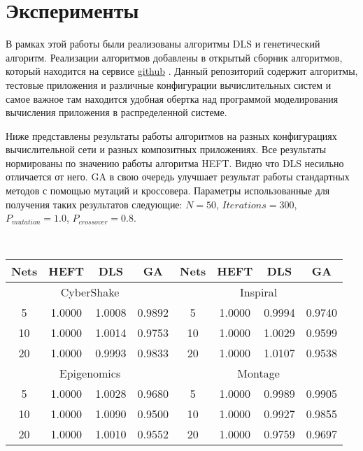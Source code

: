 \chapter*{Эксперименты}
\begin{spacing}{1.3}

В рамках этой работы были реализованы алгоритмы DLS и генетический алгоритм.  Реализации алгоритмов добавлены в открытый сборник алгоритмов, который находится на сервисе \href{https://github.com/alexmnazarenko/pysimgrid}{github} \cite{GIT}. Данный репозиторий содержит алгоритмы, тестовые приложения и различные конфигурации вычислительных систем и самое важное там находится удобная обертка над программой моделирования вычисления приложения в распределенной системе.

Ниже представлены результаты работы алгоритмов на разных конфигурациях вычислительной сети и разных композитных приложениях. Все результаты нормированы по значению работы алгоритма HEFT. Видно что DLS несильно отличается от него. GA в свою очередь улучшает результат работы стандартных методов с помощью мутаций и кроссовера. Параметры использованные для получения таких результатов следующие: $N = 50$, $Iterations = 300$, $P_{mutation} = 1.0$, $P_{crossover} = 0.8$.

~

\begin{center}
\begin{tabular}{|c|c|c|c || c|c|c|c|}
\hline
Nets & HEFT &  DLS &  GA & Nets & HEFT &  DLS &  GA \\ 
\hline
\multicolumn{4}{|c||}{CyberShake} & \multicolumn{4}{c|}{ Inspiral} \\ 
\hline
5     &     1.0000 &     1.0008 &     0.9892  & 5 &     1.0000 &     0.9994 &     0.9740 \\
\hline
10              &     1.0000 &     1.0014 &     0.9753  & 10              &     1.0000 &     1.0029 &     0.9599 \\
\hline
20              &     1.0000 &     0.9993 &     0.9833 & 20              &     1.0000 &     1.0107 &     0.9538 \\
\hline
\multicolumn{4}{|c||}{Epigenomics} & \multicolumn{4}{c|}{Montage} \\ 
\hline
5               &     1.0000 &     1.0028 &     0.9680  & 5               &     1.0000 &     0.9989 &     0.9905 \\
\hline
10              &     1.0000 &     1.0090 &     0.9500 & 10              &     1.0000 &     0.9927 &     0.9855 \\
\hline
20              &     1.0000 &     1.0010 &     0.9552 & 20              &     1.0000 &     0.9759 &     0.9697 \\
\hline

\end{tabular}
\end{center}


\end{spacing}